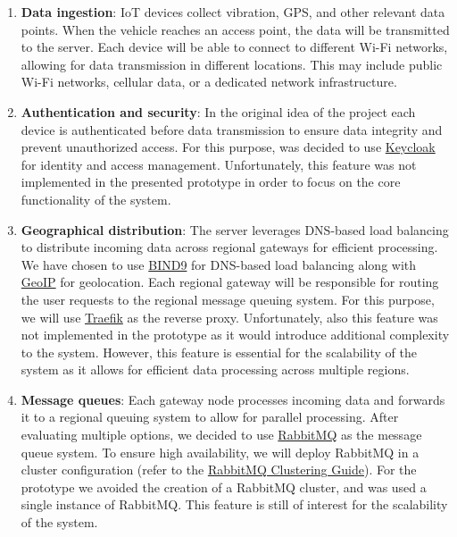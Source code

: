 \begin{enumerate}
	\item \textbf{Data ingestion}: IoT devices collect vibration, GPS, and other relevant data points. When the vehicle reaches an access point, the data will be transmitted to the server. Each device will be able to connect to different Wi-Fi networks, allowing for data transmission in different locations. This may include public Wi-Fi networks, cellular data, or a dedicated network infrastructure.

	\item \textbf{Authentication and security}: In the original idea of the project each device is authenticated before data transmission to ensure data integrity and prevent unauthorized access. For this purpose, was decided to use \href{https://www.keycloak.org/}{Keycloak} for identity and access management. Unfortunately, this feature was not implemented in the presented prototype in order to focus on the core functionality of the system.

	\item \textbf{Geographical distribution}: The server leverages DNS-based load balancing to distribute incoming data across regional gateways for efficient processing. We have chosen to use \href{https://www.isc.org/bind/}{BIND9} for DNS-based load balancing along with \href{https://www.maxmind.com/en/geoip2-databases}{GeoIP} for geolocation. Each regional gateway will be responsible for routing the user requests to the regional message queuing system. For this purpose, we will use \href{https://traefik.io/}{Traefik} as the reverse proxy. Unfortunately, also this feature was not implemented in the prototype as it would introduce additional complexity to the system. However, this feature is essential for the scalability of the system as it allows for efficient data processing across multiple regions.

	\item \textbf{Message queues}: Each gateway node processes incoming data and forwards it to a regional queuing system to allow for parallel processing. After evaluating multiple options, we decided to use \href{https://www.rabbitmq.com/}{RabbitMQ} as the message queue system. To ensure high availability, we will deploy RabbitMQ in a cluster configuration (refer to the \href{https://www.rabbitmq.com/clustering.html}{RabbitMQ Clustering Guide}). For the prototype we avoided the creation of a RabbitMQ cluster, and was used a single instance of RabbitMQ. This feature is still of interest for the scalability of the system.


\end{enumerate}
